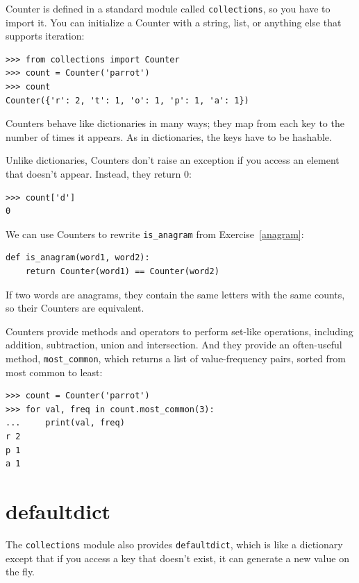 \documentclass[10pt]{book}
\begin{document}
Counter is defined in a standard module called {\tt collections},
so you have to import it.  You can initialize a Counter with a string,
list, or anything else that supports iteration:

\begin{verbatim}
>>> from collections import Counter
>>> count = Counter('parrot')
>>> count
Counter({'r': 2, 't': 1, 'o': 1, 'p': 1, 'a': 1})
\end{verbatim}

Counters behave like dictionaries in many ways; they map from each
key to the number of times it appears.  As in dictionaries,
the keys have to be hashable.

Unlike dictionaries, Counters don't raise an exception if you access
an element that doesn't appear.  Instead, they return 0:

\begin{verbatim}
>>> count['d']
0
\end{verbatim}

We can use Counters to rewrite \verb"is_anagram" from
Exercise~\ref{anagram}:

\begin{verbatim}
def is_anagram(word1, word2):
    return Counter(word1) == Counter(word2)
\end{verbatim}

If two words are anagrams, they contain the same letters with the same
counts, so their Counters are equivalent.

Counters provide methods and operators to perform set-like operations,
including addition, subtraction, union and intersection.  And
they provide an often-useful method, \verb"most_common", which
returns a list of value-frequency pairs, sorted from most common to
least:

\begin{verbatim}
>>> count = Counter('parrot')
>>> for val, freq in count.most_common(3):
...     print(val, freq)
r 2
p 1
a 1
\end{verbatim}


\section{defaultdict}

The {\tt collections} module also provides {\tt defaultdict}, which is
like a dictionary except that if you access a key that doesn't exist,
it can generate a new value on the fly.
\end{document}
